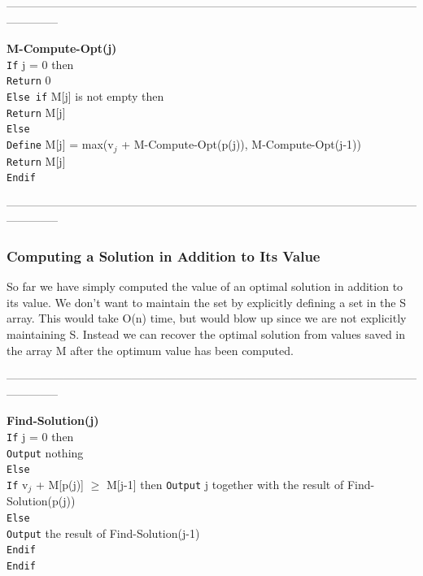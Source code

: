 \documentclass{article}
\begin{document}
\medskip

--------------------------------------------------------------------------------------------------------------------------
\medskip

\textbf{M-Compute-Opt(j)}\\
\texttt{If} j = 0 then\\
\texttt{Return} 0\\
\texttt{Else if} M[j] is not empty then\\
\texttt{Return} M[j]\\
\texttt{Else}\\
\texttt{Define} M[j] = max(v$_j$ + M-Compute-Opt(p(j)), M-Compute-Opt(j-1))\\
\texttt{Return} M[j]\\
\texttt{Endif}\\

\medskip

--------------------------------------------------------------------------------------------------------------------------
\medskip

\begin{center}
\end{center}

\subsubsection{Computing a Solution in Addition to Its Value}
So far we have simply computed the value of an optimal solution in addition to its value. We don't want to maintain the set by explicitly defining a set in the S array. This would take O(n) time, but would blow up since we are not explicitly maintaining S. Instead we can recover the optimal solution from values saved in the array M after the optimum value has been computed. 

\medskip

--------------------------------------------------------------------------------------------------------------------------
\medskip

\textbf{Find-Solution(j)}\\
\texttt{If} j = 0 then\\
\texttt{Output} nothing\\
\texttt{Else}\\
\texttt{If} v$_j$ + M[p(j)] $\ge$ M[j-1] then
\texttt{Output} j together with the result of Find-Solution(p(j))\\
\texttt{Else}\\
\texttt{Output} the result of Find-Solution(j-1)\\
\texttt{Endif}\\
\texttt{Endif}\\
 
\end{document}
